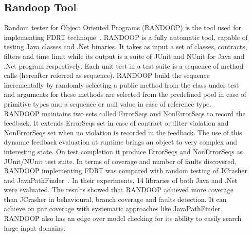 

\subsection{Randoop Tool}
Random tester for Object Oriented Programs (RANDOOP) is the tool used for implementing FDRT technique~\cite{Pacheco2007b}. RANDOOP is a fully automatic tool, capable of testing Java classes and .Net binaries. It takes as input a set of classes, contracts, filters and time limit while its output is a suite of JUnit and NUnit for Java and .Net program respectively. Each unit test in a test suite is a sequence of method calls (hereafter referred as sequence). RANDOOP build the sequence incrementally by randomly selecting a public method from the class under test and arguments for these methods are selected from the predefined pool in case of primitive types and a sequence or null value in case of reference type. RANDOOP maintains two sets called ErrorSeqs and NonErrorSeqs to record the feedback. It extends ErrorSeqs set in case of contract or filter violation and NonErrorSeqs set when no violation is recorded in the feedback. The use of this dynamic feedback evaluation at runtime brings an object to very complex and interesting state. On test completion it produce ErrorSeqs and NonErrorSeqs as JUnit/NUnit test suite. In terms of coverage and number of faults discovered, RANDOOP implementing FDRT was compared with random testing of JCrasher and JavaPathFinder~\cite{visser2004test}. In their experiments, 14 libraries of both Java and .Net were evaluated. The results showed that RANDOOP achieved more coverage than JCrasher in behavioural, branch coverage and faults detection. It can achieve on par coverage with systematic approaches like JavaPathFinder. RANDOOP also has an edge over model checking for its ability to easily search large input domains.

